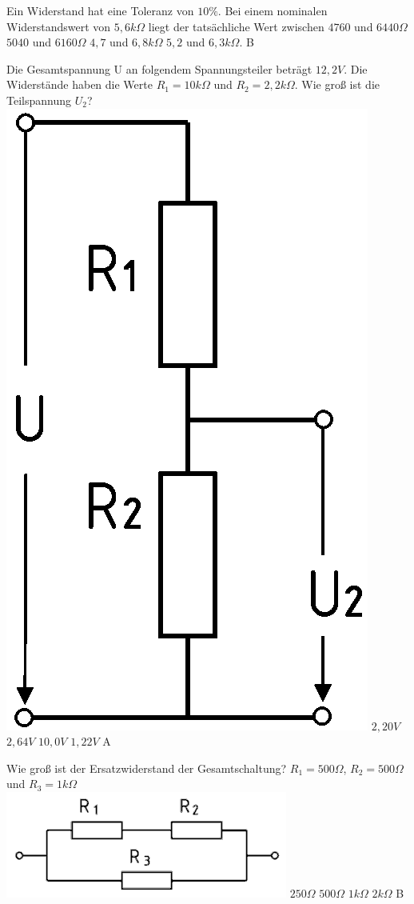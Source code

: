 {Ein Widerstand hat eine Toleranz von $10 \%$. Bei einem nominalen Widerstandswert von $5,6 k\Omega$ liegt der tatsächliche Wert zwischen}%
{$4760$ und $6440 \Omega$}%
{$5040$ und $6160 \Omega$}%
{$4,7$ und $6,8 k\Omega$}%
{$5,2$ und $6,3 k\Omega.$}%
{B}%

{Die Gesamtspannung U an folgendem Spannungsteiler beträgt $12,2V$. Die
Widerstände haben die Werte $R_1 = 10k\Omega$ und $R_2 = 2,2k\Omega$. Wie groß
ist die Teilspannung $U_2$?\\ \includegraphics[scale=0.1]{Spannungsteiler.png}}%
{$2,20V$}%
{$2,64V$}%
{$10,0V$}%
{$1,22V$}%
{A}%

{Wie groß ist der Ersatzwiderstand der Gesamtschaltung? 
$R_1 = 500\Omega$, $R_2 = 500\Omega$ und $R_3 = 1k\Omega$\\
\includegraphics[scale=0.3]{Parallelschaltung.png}}%
{$250\Omega$}%
{$500\Omega$}%
{$1k\Omega$}%
{$2k\Omega$}%
{B}%

